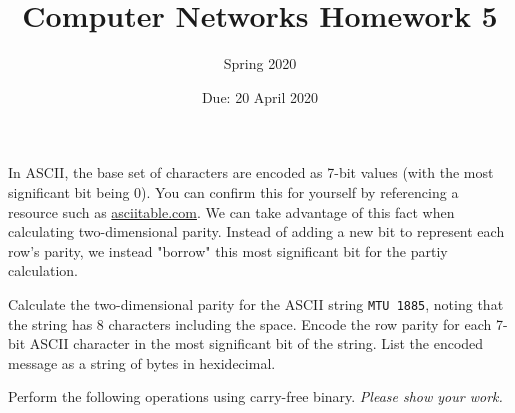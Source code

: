 \documentclass[12pt,addpoints,answers]{exam}
\title{Computer Networks Homework 5}
\author{Spring 2020}
\date{Due: 20 April 2020}
\begin{document}
\maketitle

\begin{questions}
\question[8] In ASCII, the base set of characters are encoded as 7-bit values (with the most significant bit being 0). You can confirm this for yourself by referencing a resource such as \url{asciitable.com}. We can take advantage of this fact when calculating two-dimensional parity. Instead of adding a new bit to represent each row's parity, we instead "borrow" this most significant bit for the partiy calculation.

Calculate the two-dimensional parity for the ASCII string \lstinline[showspaces=true]{MTU 1885}, noting that the string has 8 characters including the space. Encode the row parity for each 7-bit ASCII character in the most significant bit of the string. List the encoded message as a string of bytes in hexidecimal.
\begin{solution}
\end{solution}

\question Perform the following operations using carry-free binary. \emph{Please show your work.}


\end{questions}
\end{document}
